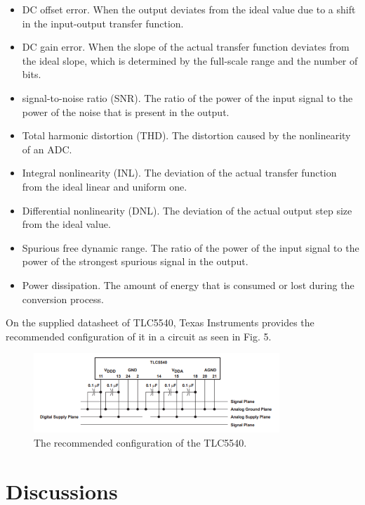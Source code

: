 \documentclass[conference]{IEEEtran}
\begin{document}
\begin{itemize}
    \item DC offset error. When the output deviates from the ideal value due to a shift in the input-output transfer function.
    \item DC gain error. When the slope of the actual transfer function deviates from the ideal slope, which is determined by the full-scale range and the number of bits.
    \item signal-to-noise ratio (SNR). The ratio of the power of the input signal to the power of the noise that is present in the output.
    \item Total harmonic distortion (THD). The distortion caused by the nonlinearity of an ADC.
    \item Integral nonlinearity (INL). The deviation of the actual transfer function from the ideal linear and uniform one.
    \item Differential nonlinearity (DNL). The deviation of the actual output step size from the ideal value.
    \item Spurious free dynamic range. The ratio of the power of the input signal to the power of the strongest spurious signal in the output.
    \item Power dissipation. The amount of energy that is consumed or lost during the conversion process.
\end{itemize}

On the supplied datasheet of TLC5540, Texas Instruments provides the recommended configuration of it in a circuit as seen in Fig. 5.

\begin{figure}[htbp]
\centerline{\includegraphics{ADCchipconfig.png}}
\caption{The recommended configuration of the TLC5540.}
\end{figure}

\section{Discussions}
\end{document}
